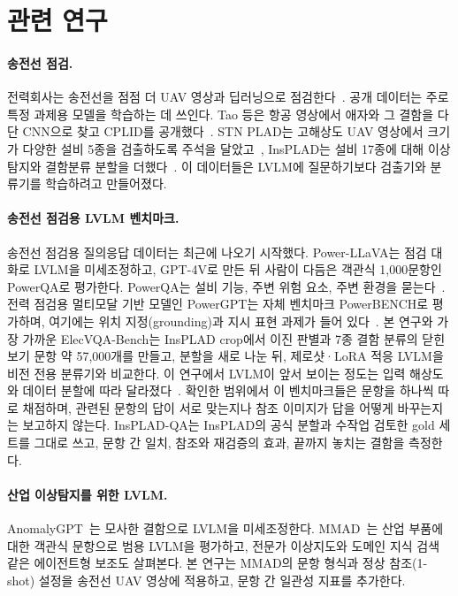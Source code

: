 \documentclass[11pt]{article}
\begin{document}
\section{관련 연구}
\paragraph{송전선 점검.} 전력회사는 송전선을 점점 더 UAV 영상과 딥러닝으로 점검한다~\cite{nguyen2018review}. 공개 데이터는 주로 특정 과제용 모델을 학습하는 데 쓰인다. Tao 등은 항공 영상에서 애자와 그 결함을 다단 CNN으로 찾고 CPLID를 공개했다~\cite{tao2020cplid}. STN PLAD는 고해상도 UAV 영상에서 크기가 다양한 설비 5종을 검출하도록 주석을 달았고~\cite{vieira2021stnplad}, InsPLAD는 설비 17종에 대해 이상탐지와 결함분류 분할을 더했다~\cite{vieira2023insplad}. 이 데이터들은 LVLM에 질문하기보다 검출기와 분류기를 학습하려고 만들어졌다.

\paragraph{송전선 점검용 LVLM 벤치마크.} 송전선 점검용 질의응답 데이터는 최근에 나오기 시작했다. Power-LLaVA는 점검 대화로 LVLM을 미세조정하고, GPT-4V로 만든 뒤 사람이 다듬은 객관식 1,000문항인 PowerQA로 평가한다. PowerQA는 설비 기능, 주변 위험 요소, 주변 환경을 묻는다~\cite{wang2024powerllava}. 전력 점검용 멀티모달 기반 모델인 PowerGPT는 자체 벤치마크 PowerBENCH로 평가하며, 여기에는 위치 지정(grounding)과 지시 표현 과제가 들어 있다~\cite{zhong2026powergpt}. 본 연구와 가장 가까운 ElecVQA-Bench는 InsPLAD crop에서 이진 판별과 7종 결함 분류의 닫힌 보기 문항 약 57,000개를 만들고, 분할을 새로 나눈 뒤, 제로샷·LoRA 적응 LVLM을 비전 전용 분류기와 비교한다. 이 연구에서 LVLM이 앞서 보이는 정도는 입력 해상도와 데이터 분할에 따라 달라졌다~\cite{zhang2026elecvqa}. 확인한 범위에서 이 벤치마크들은 문항을 하나씩 따로 채점하며, 관련된 문항의 답이 서로 맞는지나 참조 이미지가 답을 어떻게 바꾸는지는 보고하지 않는다. InsPLAD-QA는 InsPLAD의 공식 분할과 수작업 검토한 gold 세트를 그대로 쓰고, 문항 간 일치, 참조와 재검증의 효과, 끝까지 놓치는 결함을 측정한다.

\paragraph{산업 이상탐지를 위한 LVLM.} AnomalyGPT~\cite{gu2024anomalygpt}는 모사한 결함으로 LVLM을 미세조정한다. MMAD~\cite{jiang2025mmad}는 산업 부품에 대한 객관식 문항으로 범용 LVLM을 평가하고, 전문가 이상지도와 도메인 지식 검색 같은 에이전트형 보조도 살펴본다. 본 연구는 MMAD의 문항 형식과 정상 참조(1-shot) 설정을 송전선 UAV 영상에 적용하고, 문항 간 일관성 지표를 추가한다.
\end{document}
